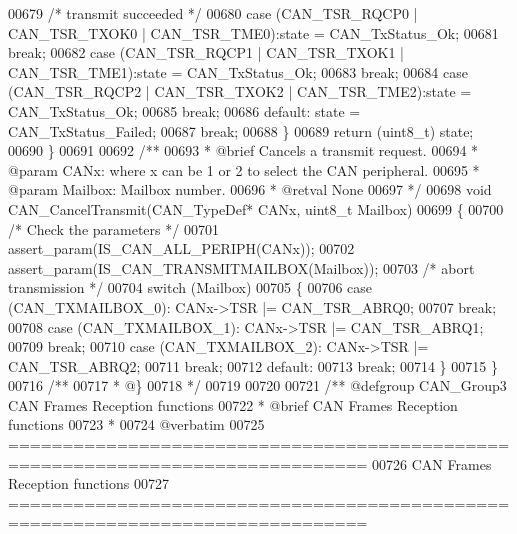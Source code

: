 \begin{DoxyCode}
00679       \textcolor{comment}{/* transmit succeeded  */}
00680     \textcolor{keywordflow}{case} (CAN_TSR_RQCP0 | CAN_TSR_TXOK0 | CAN_TSR_TME0):state = 
      CAN_TxStatus_Ok;
00681       \textcolor{keywordflow}{break};
00682     \textcolor{keywordflow}{case} (CAN_TSR_RQCP1 | CAN_TSR_TXOK1 | CAN_TSR_TME1):state = 
      CAN_TxStatus_Ok;
00683       \textcolor{keywordflow}{break};
00684     \textcolor{keywordflow}{case} (CAN_TSR_RQCP2 | CAN_TSR_TXOK2 | CAN_TSR_TME2):state = 
      CAN_TxStatus_Ok;
00685       \textcolor{keywordflow}{break};
00686     \textcolor{keywordflow}{default}: state = CAN_TxStatus_Failed;
00687       \textcolor{keywordflow}{break};
00688   \}
00689   \textcolor{keywordflow}{return} (uint8\_t) state;
00690 \}
00691 
00692 \textcolor{comment}{/**}
00693 \textcolor{comment}{  * @brief  Cancels a transmit request.}
00694 \textcolor{comment}{  * @param  CANx: where x can be 1 or 2 to select the CAN peripheral.}
00695 \textcolor{comment}{  * @param  Mailbox: Mailbox number.}
00696 \textcolor{comment}{  * @retval None}
00697 \textcolor{comment}{  */}
00698 \textcolor{keywordtype}{void} CAN_CancelTransmit(CAN\_TypeDef* CANx, uint8\_t Mailbox)
00699 \{
00700   \textcolor{comment}{/* Check the parameters */}
00701   assert_param(IS\_CAN\_ALL\_PERIPH(CANx));
00702   assert_param(IS\_CAN\_TRANSMITMAILBOX(Mailbox));
00703   \textcolor{comment}{/* abort transmission */}
00704   \textcolor{keywordflow}{switch} (Mailbox)
00705   \{
00706     \textcolor{keywordflow}{case} (CAN_TXMAILBOX_0): CANx->TSR |= CAN_TSR_ABRQ0;
00707       \textcolor{keywordflow}{break};
00708     \textcolor{keywordflow}{case} (CAN_TXMAILBOX_1): CANx->TSR |= CAN_TSR_ABRQ1;
00709       \textcolor{keywordflow}{break};
00710     \textcolor{keywordflow}{case} (CAN_TXMAILBOX_2): CANx->TSR |= CAN_TSR_ABRQ2;
00711       \textcolor{keywordflow}{break};
00712     \textcolor{keywordflow}{default}:
00713       \textcolor{keywordflow}{break};
00714   \}
00715 \}
00716 \textcolor{comment}{/**}
00717 \textcolor{comment}{  * @\}}
00718 \textcolor{comment}{  */}
00719 
00720 
00721 \textcolor{comment}{/** @defgroup CAN\_Group3 CAN Frames Reception functions}
00722 \textcolor{comment}{ *  @brief    CAN Frames Reception functions }
00723 \textcolor{comment}{ *}
00724 \textcolor{comment}{@verbatim    }
00725 \textcolor{comment}{ ===============================================================================}
00726 \textcolor{comment}{                      CAN Frames Reception functions}
00727 \textcolor{comment}{ ===============================================================================  }

\end{DoxyCode}
